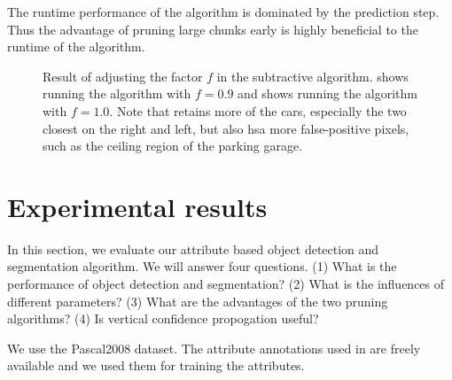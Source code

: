 \documentclass[10pt,twocolumn,letterpaper]{article}
\begin{document}
The runtime performance of the algorithm is dominated by the prediction step.
Thus the advantage of pruning large chunks early is highly beneficial to 
the runtime of the algorithm.

\begin{figure}
\centering
{}
\caption{Result of adjusting the factor $f$ in the subtractive algorithm.
 shows running the algorithm with $f=0.9$ and 
shows running the algorithm with $f=1.0$.  Note that  retains
more of the cars, especially the two closest on the right and left, but also
hsa more false-positive pixels, such as the ceiling region of the parking
garage.}
\label{fig:f}
\end{figure}

\section{Experimental results}
\label{sec:results}

In this section, we evaluate our attribute based object detection and segmentation algorithm. We will answer four questions. (1) What is the performance of object detection and segmentation? (2) What is the influences of different parameters? (3) What are the advantages of the two pruning algorithms? (4) Is vertical confidence propogation useful? 


We use the Pascal2008 dataset.  The attribute annotations used in \cite{farhadi09}
are freely available and we used them for training the attributes.
\end{document}
